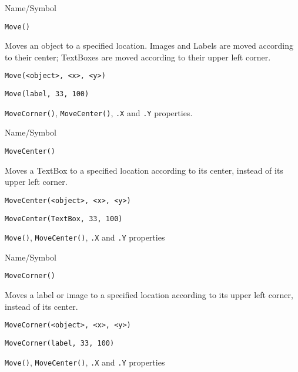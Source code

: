 \begin{desc}{Name/Symbol}
\item[Name/Symbol]	\verb+Move()+

\item[Description]	Moves an object to a specified location.  
		Images and Labels are moved according to their center; 
		TextBoxes are moved according to their upper left corner.

\item[Usage]
\begin{verbatim}
Move(<object>, <x>, <y>)
\end{verbatim}

\item[Example]	
\begin{verbatim}
Move(label, 33, 100)
\end{verbatim}

\item[See Also]	\verb+MoveCorner()+, \verb+MoveCenter()+, \verb+.X+ and \verb+.Y+ properties.
\end{desc}
\begin{desc}{Name/Symbol}
\item[Name/Symbol]	\verb+MoveCenter()+

\item[Description]	Moves a TextBox to a specified location
		according to its center, instead of its upper left corner.

\item[Usage]
\begin{verbatim}
MoveCenter(<object>, <x>, <y>)
\end{verbatim}

\item[Example]	
\begin{verbatim}
MoveCenter(TextBox, 33, 100)
\end{verbatim}

\item[See Also]	\verb+Move()+, \verb+MoveCenter()+, \verb+.X+ and \verb+.Y+ properties
\end{desc}

\begin{desc}{Name/Symbol}
\item[Name/Symbol]	\verb+MoveCorner()+

\item[Description]	Moves a label or image to a specified location
		according to its upper left corner, instead of its center. 

\item[Usage]
\begin{verbatim}
MoveCorner(<object>, <x>, <y>)
\end{verbatim}

\item[Example]	
\begin{verbatim}
MoveCorner(label, 33, 100)
\end{verbatim}

\item[See Also]	\verb+Move()+, \verb+MoveCenter()+, \verb+.X+ and \verb+.Y+ properties
\end{desc}





